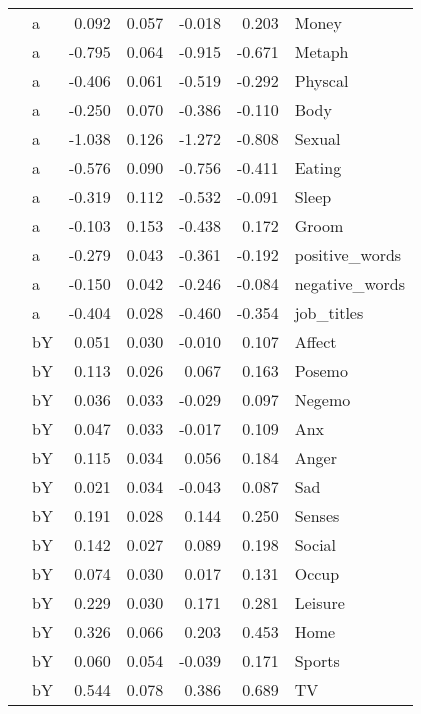 \documentclass[11pt,a4paper]{article}
\begin{document}
\begin{longtable}{llrrrrl}
   & a &  0.092 &  0.057 &   -0.018 &     0.203 &           Money \\
   & a & -0.795 &  0.064 &   -0.915 &    -0.671 &          Metaph \\
   & a & -0.406 &  0.061 &   -0.519 &    -0.292 &         Physcal \\
   & a & -0.250 &  0.070 &   -0.386 &    -0.110 &            Body \\
   & a & -1.038 &  0.126 &   -1.272 &    -0.808 &          Sexual \\
   & a & -0.576 &  0.090 &   -0.756 &    -0.411 &          Eating \\
   & a & -0.319 &  0.112 &   -0.532 &    -0.091 &           Sleep \\
   & a & -0.103 &  0.153 &   -0.438 &     0.172 &           Groom \\
   & a & -0.279 &  0.043 &   -0.361 &    -0.192 &  positive\_words \\
   & a & -0.150 &  0.042 &   -0.246 &    -0.084 &  negative\_words \\
   & a & -0.404 &  0.028 &   -0.460 &    -0.354 &      job\_titles \\
   & bY &  0.051 &  0.030 &   -0.010 &     0.107 &          Affect \\
   & bY &  0.113 &  0.026 &    0.067 &     0.163 &          Posemo \\
   & bY &  0.036 &  0.033 &   -0.029 &     0.097 &          Negemo \\
   & bY &  0.047 &  0.033 &   -0.017 &     0.109 &             Anx \\
   & bY &  0.115 &  0.034 &    0.056 &     0.184 &           Anger \\
   & bY &  0.021 &  0.034 &   -0.043 &     0.087 &             Sad \\
   & bY &  0.191 &  0.028 &    0.144 &     0.250 &          Senses \\
   & bY &  0.142 &  0.027 &    0.089 &     0.198 &          Social \\
   & bY &  0.074 &  0.030 &    0.017 &     0.131 &           Occup \\
   & bY &  0.229 &  0.030 &    0.171 &     0.281 &         Leisure \\
   & bY &  0.326 &  0.066 &    0.203 &     0.453 &            Home \\
   & bY &  0.060 &  0.054 &   -0.039 &     0.171 &          Sports \\
   & bY &  0.544 &  0.078 &    0.386 &     0.689 &              TV \\

\end{longtable}
\end{document}
